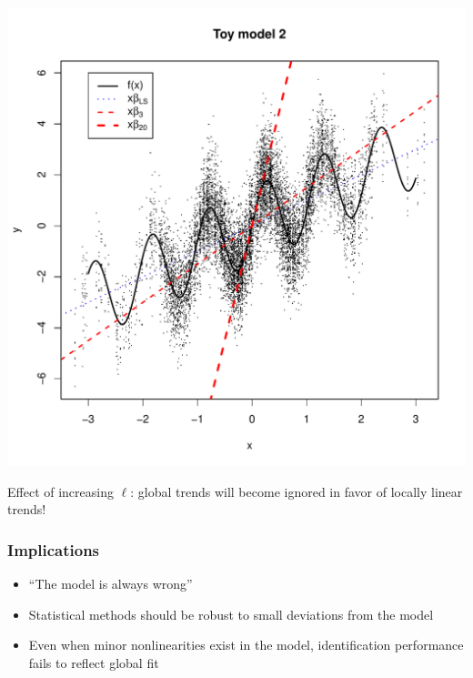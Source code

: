 \documentclass{beamer}
\begin{document}
\begin{frame}
\begin{center}
\includegraphics[scale = 0.4]{toy2_plot2.pdf}
\end{center}
Effect of increasing $\ell$: global trends will become ignored in
favor of locally linear trends!
\end{frame}

\begin{frame}
\frametitle{Implications}
\begin{itemize}
\item
``The model is always wrong''
\item
Statistical methods should be robust to small deviations from the
model
\item
Even when minor nonlinearities exist in the model, identification
performance fails to reflect global fit
\end{itemize}
\end{frame}
\end{document}
